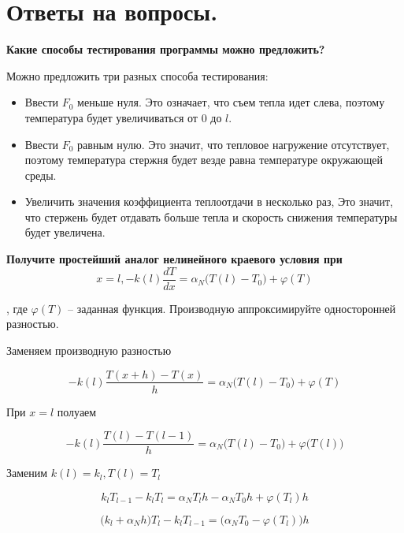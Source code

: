\chapter{Ответы на вопросы.}

\textbf{Какие способы тестирования программы можно предложить?}

Можно предложить три разных способа тестирования:
\begin{itemize}
    \item Ввести $F_0$  меньше нуля. Это означает, что съем тепла идет слева, поэтому температура будет увеличиваться от $0$ до $l$.
    \item Ввести $F_0$  равным нулю. Это значит, что тепловое нагружение отсутствует, поэтому температура стержня будет везде равна температуре окружающей среды.
    \item Увеличить значения коэффициента теплоотдачи в несколько раз, Это значит, что стержень будет отдавать больше тепла и скорость снижения температуры будет увеличена.
\end{itemize}

\textbf{Получите простейший аналог нелинейного краевого условия при}
\begin{equation*}
    x = l, -k(l) \frac{dT}{dx} = \alpha_N \big( T(l) - T_0 \big) + \varphi(T)
\end{equation*}

, где $\varphi(T)$ -- заданная функция. Производную аппроксимируйте односторонней разностью.

Заменяем производную разностью

\begin{equation*}
    -k(l) \frac{T(x + h) - T(x)}{h} = \alpha_N \big( T(l) - T_0 \big) + \varphi(T)
\end{equation*}

При $x = l$ полуаем

\begin{equation*}
    -k(l) \frac{T(l) - T(l-1)}{h} = \alpha_N \big(T(l) - T_0 \big) +
    \varphi \big(T(l) \big)
\end{equation*}

Заменим $k(l) = k_l, T(l) = T_l$

\begin{equation*}
    k_l T_{l-1} - k_l T_l = \alpha_N T_l h - \alpha_NT_0 h + \varphi(T_l) h
\end{equation*}

\begin{equation*}
    \big( k_l + \alpha_N h \big) T_l - k_l T_{l-1} = \big( \alpha_NT_0 - \varphi(T_l) \big) h
\end{equation*}

